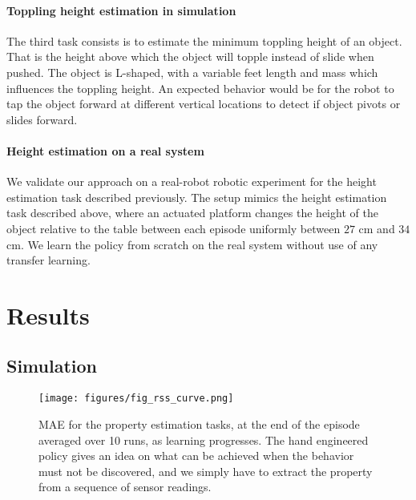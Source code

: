 \documentclass[anon]{l4dc2024}
\begin{document}
\paragraph{Toppling height estimation in simulation}
The third task consists is to estimate the minimum toppling height of an object. That is the height above which the object will topple instead of slide when pushed.
The object is L-shaped, with a variable feet length and mass which influences the toppling height. An expected behavior would be for the robot to tap the object forward at different vertical locations to detect if object pivots or slides forward.

\paragraph{Height estimation on a real system}
We validate our approach on a real-robot robotic experiment for the height estimation task described previously.
The setup mimics the height estimation task described above, where an actuated platform changes the  height of the object relative to the table between each episode uniformly between $27$ cm and $34$ cm.
We learn the policy from scratch on the real system without use of any transfer learning.

\section{Results}
\label{sec:results}
\subsection{Simulation}

\begin{figure}
    \centering
    \texttt{[image: figures/fig\_rss\_curve.png]}
    \caption{\Acf{MAE} for the property estimation tasks, at the end of the episode averaged over 10 runs, as learning progresses. The hand engineered policy gives an idea on what can be achieved when the behavior must not be discovered, and we simply have to extract the property from a sequence of sensor readings.}
    \label{fig:logprob}
\end{figure}
\end{document}
